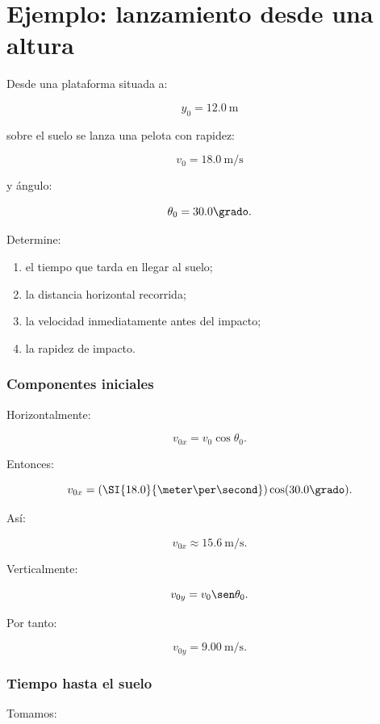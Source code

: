 \section{Ejemplo: lanzamiento desde una altura}

\begin{ejemplo}
Desde una plataforma situada a:

\[
y_0=\SI{12.0}{\meter}
\]

sobre el suelo se lanza una pelota con rapidez:

\[
v_0=\SI{18.0}{\meter\per\second}
\]

y ángulo:

\[
\theta_0=30.0\grado.
\]

Determine:

\begin{enumerate}[label=\alph*)]
    \item el tiempo que tarda en llegar al suelo;
    \item la distancia horizontal recorrida;
    \item la velocidad inmediatamente antes del impacto;
    \item la rapidez de impacto.
\end{enumerate}
\end{ejemplo}


\subsubsection*{Componentes iniciales}

Horizontalmente:

\[
v_{0x}
=
v_0\cos\theta_0.
\]

Entonces:

\[
v_{0x}
=
(\SI{18.0}{\meter\per\second})
\cos(30.0\grado).
\]

Así:

\[
\boxed{
v_{0x}\approx\SI{15.6}{\meter\per\second}
}.
\]

Verticalmente:

\[
v_{0y}
=
v_0\sen\theta_0.
\]

Por tanto:

\[
\boxed{
v_{0y}=\SI{9.00}{\meter\per\second}
}.
\]


\subsubsection*{Tiempo hasta el suelo}

Tomamos:


